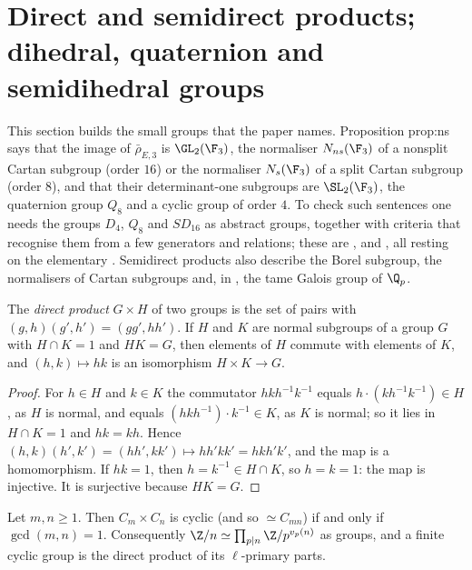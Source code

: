 \section[Products and the small groups]{Direct and semidirect products; dihedral, quaternion and semidihedral groups}\label{sec:groups:products}

This section builds the small groups that the paper names. Proposition prop:ns says that the image of $\bar\rho_{E,3}$ is
$\GL_2(\F_3)$, the normaliser $N_{ns}(\F_3)$ of a nonsplit Cartan subgroup (order $16$) or the normaliser $N_s(\F_3)$ of a split
Cartan subgroup (order $8$), and that their determinant-one subgroups are $\SL_2(\F_3)$, the quaternion group $Q_8$ and a cyclic group
of order $4$. To check such sentences one needs the groups $D_4$, $Q_8$ and $SD_{16}$ as abstract groups, together with criteria that
recognise them from a few generators and relations; these are ,  and
, all resting on the elementary . Semidirect products also describe the
Borel subgroup, the normalisers of Cartan subgroups and, in , the tame Galois group of $\Q_p$.

\begin{proposition}\label{prop:groups:directproduct}
The \emph{direct product} $G\times H$ of two groups is the set of pairs with $(g,h)(g',h')=(gg',hh')$. If $H$ and $K$ are normal subgroups of a
group $G$ with $H\cap K=1$ and $HK=G$, then elements of $H$ commute with elements of $K$, and $(h,k)\mapsto hk$ is an isomorphism
$H\times K\to G$.
\end{proposition}

\begin{proof}
For $h\in H$ and $k\in K$ the commutator $hkh^{-1}k^{-1}$ equals $h\cdot(kh^{-1}k^{-1})\in H$, as $H$ is normal, and equals $(hkh^{-1})\cdot k^{-1}\in K$, as $K$ is
normal; so it lies in $H\cap K=1$ and $hk=kh$. Hence $(h,k)(h',k')=(hh',kk')\mapsto hh'kk'=hkh'k'$, and the map is a homomorphism. If $hk=1$, then
$h=k^{-1}\in H\cap K$, so $h=k=1$: the map is injective. It is surjective because $HK=G$.
\end{proof}

\begin{proposition}\label{prop:groups:crtgroups}
Let $m,n\ge1$. Then $C_m\times C_n$ is cyclic (and so $\simeq C_{mn}$) if and only if $\gcd(m,n)=1$. Consequently
$\Z/n\simeq\prod_{p\mid n}\Z/p^{v_p(n)}$ as groups, and a finite cyclic group is the direct product of its $\ell$-primary parts.
\end{proposition}

